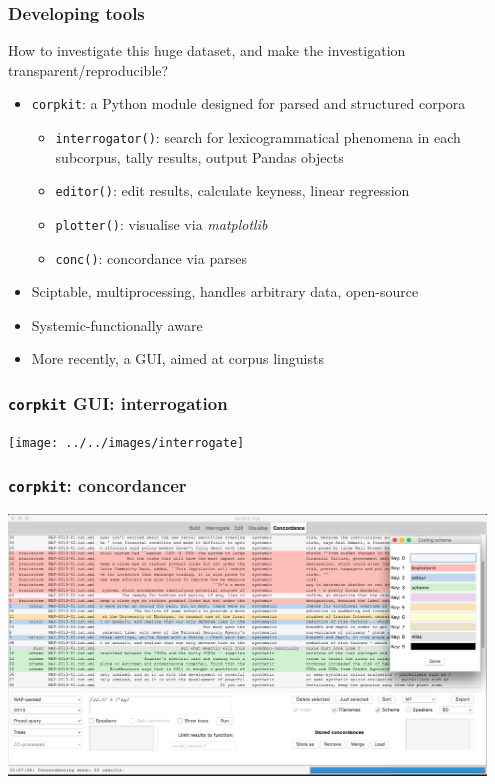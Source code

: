 \documentclass{beamer}       %
\begin{document}
\begin{frame}\frametitle{Developing tools}
How to investigate this huge dataset, and make the investigation transparent\slash reproducible?

\begin{itemize}
    \item \texttt{corpkit}: a Python module designed for parsed and structured corpora
    \begin{itemize}
        \item \texttt{interrogator()}: search for lexicogrammatical phenomena in each subcorpus, tally results, output Pandas objects
        \item \texttt{editor()}: edit results, calculate keyness, linear regression 
        \item \texttt{plotter()}: visualise via \emph{matplotlib} 
        \item \texttt{conc()}: concordance via parses 
    \end{itemize}
    \item Sciptable, multiprocessing, handles arbitrary data, open-source
    \item Systemic-functionally aware
    \item More recently, a GUI, aimed at corpus linguists
\end{itemize}
\end{frame}

\begin{frame}
    \frametitle{\texttt{corpkit} GUI: interrogation}
    \centering
    \texttt{[image: ../../images/interrogate]}
\end{frame}

\begin{frame}
    \frametitle{\texttt{corpkit}: concordancer}
    \centering
    \includegraphics[width=0.95\textwidth]{../../images/conc2}
\end{frame}
\end{document}
